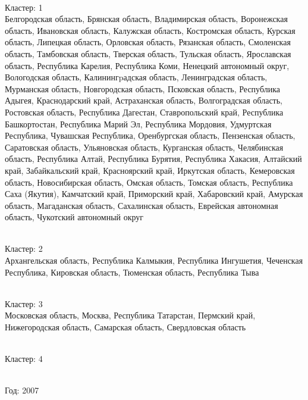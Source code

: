 \documentclass[11pt]{article}
\begin{document}
\newline \\ Кластер:  1
\\ Белгородская область, Брянская область, Владимирская область, Воронежская область, Ивановская область, Калужская область, Костромская область, Курская область, Липецкая область, Орловская область, Рязанская область, Смоленская область, Тамбовская область, Тверская область, Тульская область, Ярославская область, Республика Карелия, Республика Коми, Ненецкий автономный округ, Вологодская область, Калинингpадская область, Ленинградская область, Мурманская область, Новгородская область, Псковская область, Республика Адыгея, Краснодарский край, Астраханская область, Волгоградская область, Ростовская область, Республика Дагестан, Ставропольский край, Республика Башкортостан, Республика Марий Эл, Республика Мордовия, Удмуртская Республика, Чувашская Республика, Оренбургская область, Пензенская область, Саратовская область, Ульяновская область, Курганская область, Челябинская область, Республика Алтай, Республика Бурятия, Республика Хакасия, Алтайский край, Забайкальский край, Красноярский край, Иркутская область, Кемеровская область, Новосибирская область, Омская область, Томская область, Республика Саха (Якутия), Камчатский край, Приморский край, Хабаровский край, Амурская область, Магаданская область, Сахалинская область, Еврейская автономная область, Чукотский автономный округ

\newline \\ Кластер:  2
\\ Архангельская область, Республика Калмыкия, Республика Ингушетия, Чеченская Республика, Кировская область, Тюменская область, Республика Тыва

\newline \\ Кластер:  3
\\ Московская область, Москва, Республика Татарстан, Пермский край, Нижегородская область, Самарская область, Свердловская область

\newline \\ Кластер:  4



\newline \newline \\ Год:  2007
\end{document}
